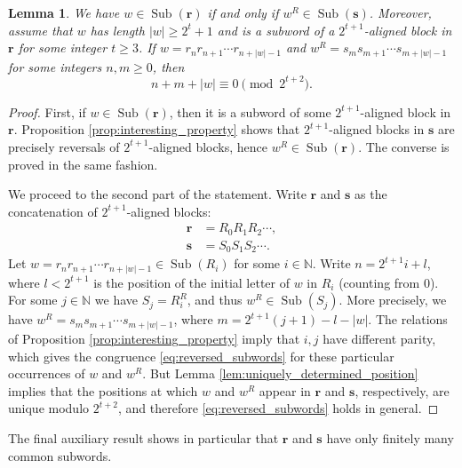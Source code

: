 \documentclass[a4paper,11pt]{amsart}
\newtheorem{lem}[thm]{Lemma}
\theoremstyle{definition}
\newcommand{\N}{\mathbb{N}}
\newcommand{\Sub}{\operatorname{Sub}}
\begin{document}
\begin{lem} \label{lem:reversed_subwords}
We have $w \in \Sub(\mathbf{r})$ if and only if $w^R \in \Sub(\mathbf{s})$.
Moreover, assume that $w$ has length $|w| \geq 2^t+1$ and is a subword of a $2^{t+1}$-aligned block in $\mathbf{r}$ for some integer $t \geq 3$. If $w = r_n r_{n+1} \cdots r_{n+|w|-1}$ and $w^R = s_m s_{m+1} \cdots s_{m+|w|-1}$ for some integers $n,m \geq 0$, then
\begin{equation} \label{eq:reversed_subwords}
n + m + |w| \equiv 0 \pmod{2^{t+2}}.
\end{equation}
\end{lem}
\begin{proof}
First, if $w \in \Sub(\mathbf{r})$, then it is a subword of some $2^{t+1}$-aligned block in $\mathbf{r}$. Proposition \ref{prop:interesting_property} shows that $2^{t+1}$-aligned blocks in $\mathbf{s}$ are precisely reversals of $2^{t+1}$-aligned blocks, hence $w^R \in \Sub(\mathbf{r})$. The converse is proved in the same fashion.

We proceed to the second part of the statement. Write $\mathbf{r}$ and $\mathbf{s}$ as the concatenation of $2^{t+1}$-aligned blocks:
\begin{align*}
\mathbf{r} &= R_0 R_1 R_2 \cdots,  \\
\mathbf{s} &= S_0 S_1 S_2 \cdots. 
\end{align*}
Let $w = r_n r_{n+1} \cdots r_{n+|w|-1} \in \Sub(R_i)$ for some $i \in \N$.
Write $n = 2^{t+1} i +l$, where $l < 2^{t+1}$ is the position of the initial letter of $w$ in $R_i$ (counting from $0$). For some $j \in \N$ we have $S_j = R_i^R$, and thus $w^R \in \Sub(S_j)$. More precisely, we have $w^R = s_m s_{m+1} \cdots s_{m+|w|-1}$, where $m = 2^{t+1} (j+1) - l - |w|$. The relations of Proposition \ref{prop:interesting_property} imply that $i,j$ have different parity, which gives the congruence \eqref{eq:reversed_subwords} for these particular occurrences of $w$ and $w^R$. But Lemma \ref{lem:uniquely_determined_position} implies that the positions at which $w$ and $w^R$ appear in $\mathbf{r}$ and $\mathbf{s}$, respectively, are unique modulo $2^{t+2}$, and therefore \eqref{eq:reversed_subwords} holds in general.
\end{proof}

The final auxiliary result shows in particular that $\mathbf{r}$ and $\mathbf{s}$ have only finitely many common subwords.
\end{document}

